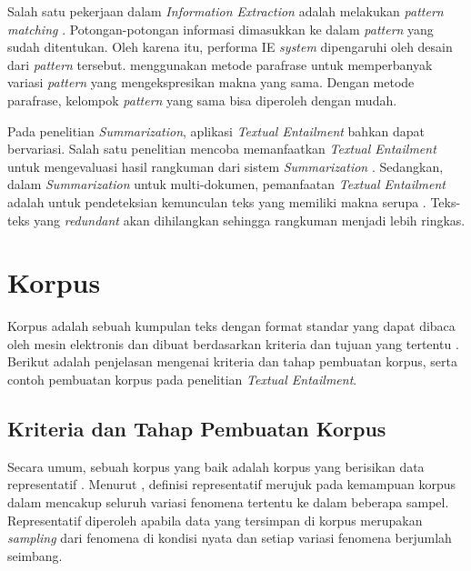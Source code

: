 	Salah satu pekerjaan dalam \textit{Information Extraction} adalah melakukan \textit{pattern matching} \citep{grishman1997information}. Potongan-potongan informasi dimasukkan ke dalam \textit{pattern} yang sudah ditentukan. Oleh karena itu, performa IE \textit{system} dipengaruhi oleh desain dari \textit{pattern} tersebut. \cite{shinyama2003paraphrase} menggunakan metode parafrase untuk memperbanyak variasi \textit{pattern} yang mengekspresikan makna yang sama. Dengan metode parafrase, kelompok \textit{pattern} yang sama bisa diperoleh dengan mudah. 
	
	Pada penelitian \textit{Summarization}, aplikasi \textit{Textual Entailment} bahkan dapat bervariasi. Salah satu penelitian mencoba memanfaatkan \textit{Textual Entailment} untuk mengevaluasi hasil rangkuman dari sistem \textit{Summarization} \citep{bhaskar-pakray:2013:RANLPStud-2013}. Sedangkan, dalam  \textit{Summarization} untuk multi-dokumen, pemanfaatan \textit{Textual Entailment} adalah untuk pendeteksian kemunculan teks yang memiliki makna serupa \citep{Radev:2000:CTI:1117736.1117745}. Teks-teks yang \textit{redundant} akan dihilangkan sehingga rangkuman menjadi lebih ringkas.

\section{Korpus}
Korpus adalah sebuah kumpulan teks dengan format standar yang dapat dibaca oleh mesin elektronis dan dibuat berdasarkan kriteria dan tujuan yang tertentu \citep{ATKINS01011992}. Berikut adalah penjelasan mengenai kriteria dan tahap pembuatan korpus, serta contoh pembuatan korpus pada penelitian \textit{Textual Entailment}.
	
	\subsection{Kriteria dan Tahap Pembuatan Korpus}
	Secara umum, sebuah korpus yang baik adalah korpus yang berisikan data representatif \citep{xiao2010corpus}. Menurut \cite{biber1993representativeness}, definisi representatif merujuk pada kemampuan korpus dalam mencakup seluruh variasi fenomena tertentu ke dalam beberapa sampel. Representatif diperoleh apabila data yang tersimpan di korpus merupakan \textit{sampling} dari fenomena di kondisi nyata dan setiap variasi fenomena berjumlah seimbang.
	
